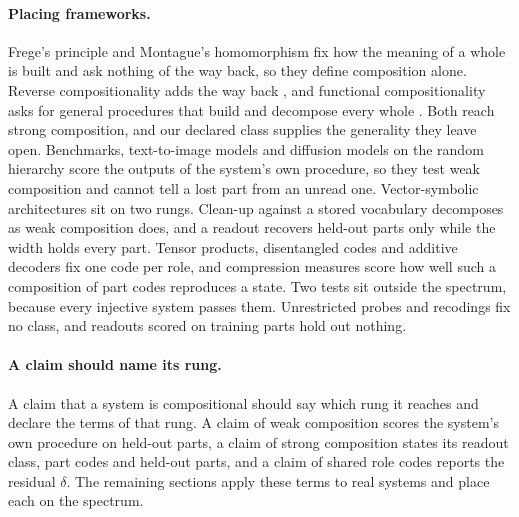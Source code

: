 \documentclass[10pt]{article}
\theoremstyle{plain}
\theoremstyle{remark}
\begin{document}
\paragraph{Placing frameworks.} Frege's principle and Montague's homomorphism fix how the meaning of a whole is built and ask nothing of the way back, so they define composition alone. Reverse compositionality adds the way back \citep{fodor2002}, and functional compositionality asks for general procedures that build and decompose every whole \citep{vangelder1990}. Both reach strong composition, and our declared class supplies the generality they leave open. Benchmarks, text-to-image models and diffusion models on the random hierarchy score the outputs of the system's own procedure, so they test weak composition and cannot tell a lost part from an unread one. Vector-symbolic architectures sit on two rungs. Clean-up against a stored vocabulary decomposes as weak composition does, and a readout recovers held-out parts only while the width holds every part. Tensor products, disentangled codes and additive decoders fix one code per role, and compression measures score how well such a composition of part codes reproduces a state. Two tests sit outside the spectrum, because every injective system passes them. Unrestricted probes and recodings fix no class, and readouts scored on training parts hold out nothing.

\paragraph{A claim should name its rung.} A claim that a system is compositional should say which rung it reaches and declare the terms of that rung. A claim of weak composition scores the system's own procedure on held-out parts, a claim of strong composition states its readout class, part codes and held-out parts, and a claim of shared role codes reports the residual $\delta$. The remaining sections apply these terms to real systems and place each on the spectrum.
\end{document}
